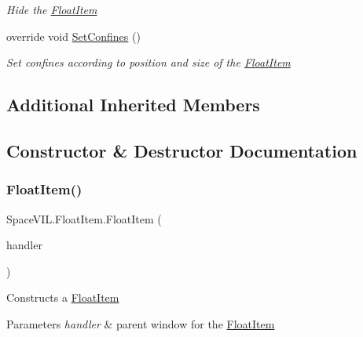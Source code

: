 \begin{DoxyCompactItemize}
\begin{DoxyCompactList}\small\item\em Hide the \mbox{\hyperlink{class_space_v_i_l_1_1_float_item}{Float\+Item}} \end{DoxyCompactList}\item 
override void \mbox{\hyperlink{class_space_v_i_l_1_1_float_item_ada12a95045db04f1a5e196a14f1a8d0f}{Set\+Confines}} ()
\begin{DoxyCompactList}\small\item\em Set confines according to position and size of the \mbox{\hyperlink{class_space_v_i_l_1_1_float_item}{Float\+Item}} \end{DoxyCompactList}\end{DoxyCompactItemize}
\subsection*{Additional Inherited Members}


\subsection{Constructor \& Destructor Documentation}
\mbox{\label{class_space_v_i_l_1_1_float_item_af80858fea5cd334aeea694ad34f9e9e6}} 
\subsubsection{\texorpdfstring{Float\+Item()}{FloatItem()}}
{\footnotesize\ttfamily Space\+V\+I\+L.\+Float\+Item.\+Float\+Item (\begin{DoxyParamCaption}\item[{\mbox{\hyperlink{class_space_v_i_l_1_1_window_layout}{Window\+Layout}}}]{handler }\end{DoxyParamCaption})\hspace{0.3cm}{\ttfamily [inline]}}



Constructs a \mbox{\hyperlink{class_space_v_i_l_1_1_float_item}{Float\+Item}} 


\begin{DoxyParams}{Parameters}
{\em handler} & parent window for the \mbox{\hyperlink{class_space_v_i_l_1_1_float_item}{Float\+Item}} \\
\hline
\end{DoxyParams}


